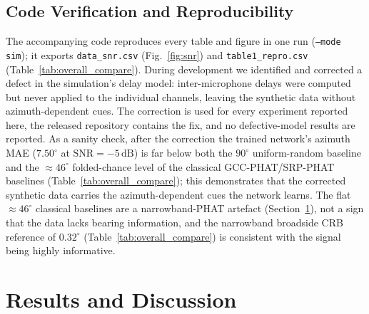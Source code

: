 \documentclass[sensors,article,submit,pdftex,moreauthors]{Definitions/mdpi}
\begin{document}
\subsection{Code Verification and Reproducibility}
\label{sec:repro}
The accompanying code reproduces every table and figure in one run (\texttt{--mode sim}); it exports \texttt{data\_snr.csv} (Fig.~\ref{fig:snr}) and \texttt{table1\_repro.csv} (Table~\ref{tab:overall_compare}). During development we identified and corrected a defect in the simulation's delay model: inter-microphone delays were computed but never applied to the individual channels, leaving the synthetic data without azimuth-dependent cues. The correction is used for every experiment reported here, the released repository contains the fix, and no defective-model results are reported. As a sanity check, after the correction the trained network's azimuth MAE ($7.50^\circ$ at $\mathrm{SNR}=-5\,\mathrm{dB}$) is far below both the $90^\circ$ uniform-random baseline and the $\approx46^\circ$ folded-chance level of the classical GCC-PHAT/SRP-PHAT baselines (Table~\ref{tab:overall_compare}); this demonstrates that the corrected synthetic data carries the azimuth-dependent cues the network learns. The flat $\approx46^\circ$ classical baselines are a narrowband-PHAT artefact (Section~\ref{sec:results}), not a sign that the data lacks bearing information, and the narrowband broadside CRB reference of $0.32^\circ$ (Table~\ref{tab:overall_compare}) is consistent with the signal being highly informative.

\section{Results and Discussion}
\label{sec:results}
\end{document}
